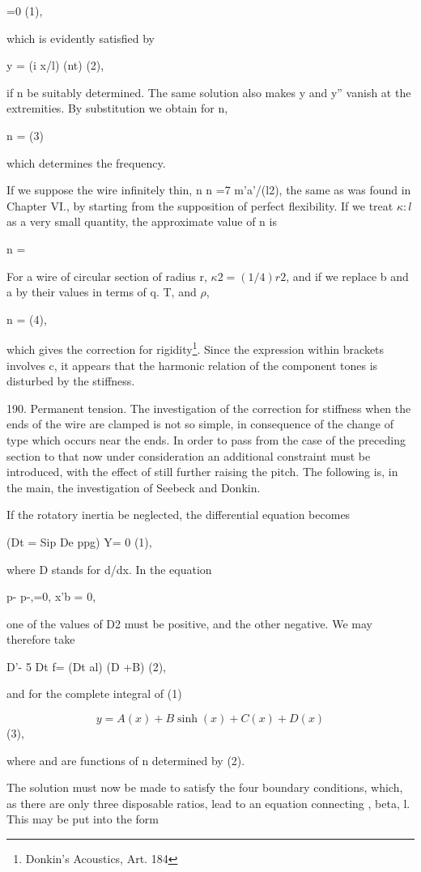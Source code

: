 =0 (1),

which is evidently satisfied by

y = (i x/l) (nt) (2),

if n be suitably determined. The same solution also makes y and y''
vanish at the extremities. By substitution we obtain for n,

n = (3)

which determines the frequency.

If we suppose the wire infinitely thin, n n =7 m'a'/(l2), the same as
was found in Chapter VI., by starting from the supposition of perfect
flexibility. If we treat \(\kappa :l\) as a very small quantity, the
approximate value of n is

n =

For a wire of circular section of radius r, \(\kappa 2 =(1/4) r2\), and
if we replace b and a by their values in terms of q. T, and \(\rho\),

n = (4),

which gives the correction for rigidity\footnote{Donkin's Acoustics, Art. 184}.
Since the expression within brackets involves c, it appears that the harmonic
relation of the component tones is disturbed by the stiffness.

190. Permanent tension.
The investigation of the correction for stiffness when the ends of
the wire are clamped is not so simple, in consequence of the change of
type which occurs near the ends. In order to pass from the case of the
preceding section to that now under consideration an additional
constraint must be introduced, with the effect of still further raising
the pitch. The following is, in the main, the investigation of Seebeck and Donkin.

If the rotatory inertia be neglected, the differential equation becomes

(Dt = Sip De ppg) Y= 0 (1),

where D stands for d/dx. In the equation

p- p-,=0, x'b = 0,

one of the values of D2 must be positive, and the other negative. We may
therefore take

D'- 5 Dt f= (Dt al) (D +B) (2),

and for the complete integral of (1)

\[ y=A (x) + B \sinh(x) + C (x) + D (x) \]
(3),

where and are functions of n determined by (2).

The solution must now be made to satisfy the four boundary conditions,
which, as there are only three disposable ratios, lead to an equation
connecting , beta, l. This may be put into the form

